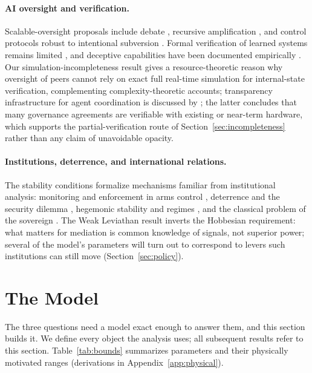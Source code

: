 \documentclass[manuscript,screen,review]{jair}
\begin{document}
\paragraph{AI oversight and verification.}
{\sloppy
Scalable-oversight proposals include debate \cite{irving.2018,debate.doubleefficient.2023}, recursive amplification \cite{christiano.2018}, and control protocols robust to intentional subversion \cite{greenblatt.2023,oversight.game.2025}. Formal verification of learned systems remains limited \cite{verification.methods.2024}, and deceptive capabilities have been documented empirically \cite{park.2023,masters.2021}. Our simulation-incompleteness result gives a resource-theoretic reason why oversight of peers cannot rely on exact full real-time simulation for internal-state verification, complementing complexity-theoretic accounts; transparency infrastructure for agent coordination is discussed by \citet{coordination.transparency.2026,oxford.aigi.2025}; the latter concludes that many governance agreements are verifiable with existing or near-term hardware, which supports the partial-verification route of Section~\ref{sec:incompleteness} rather than any claim of unavoidable opacity.\par}

\paragraph{Institutions, deterrence, and international relations.}
The stability conditions formalize mechanisms familiar from institutional analysis: monitoring and enforcement in arms control \cite{iaea.2002,ctbt.2012,avenhaus.2002}, deterrence and the security dilemma \cite{schelling.1960,jervis.1978,waltz.1979,fearon.1995}, hegemonic stability and regimes \cite{keohane.1984,krasner.1983}, and the classical problem of the sovereign \cite{hobbes.1651}. The Weak Leviathan result inverts the Hobbesian requirement: what matters for mediation is common knowledge of signals, not superior power; several of the model's parameters will turn out to correspond to levers such institutions can still move (Section~\ref{sec:policy}).

\section{The Model}
\label{sec:model}

The three questions need a model exact enough to answer them, and this section builds it. We define every object the analysis uses; all subsequent results refer to this section. Table~\ref{tab:bounds} summarizes parameters and their physically motivated ranges (derivations in Appendix~\ref{app:physical}).
\end{document}
